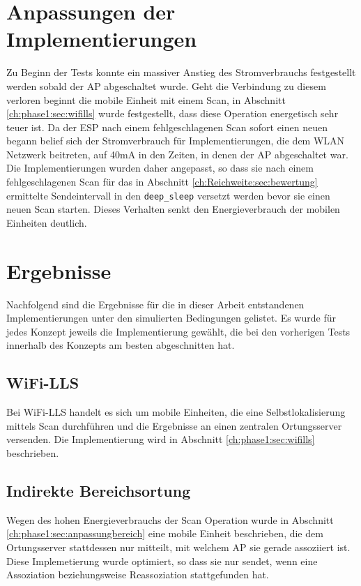 \section{Anpassungen der Implementierungen}
Zu Beginn der Tests konnte ein massiver Anstieg des Stromverbrauchs festgestellt werden sobald der AP abgeschaltet wurde.
Geht die Verbindung zu diesem verloren beginnt die mobile Einheit mit einem Scan, in Abschnitt \ref{ch:phase1:sec:wifills} wurde festgestellt, dass diese Operation energetisch sehr teuer ist.
Da der ESP nach einem fehlgeschlagenen Scan sofort einen neuen begann belief sich der Stromverbrauch für Implementierungen, die dem WLAN Netzwerk beitreten, auf 40mA in den Zeiten, in denen der AP abgeschaltet war.
Die Implementierungen wurden daher angepasst, so dass sie nach einem fehlgeschlagenen Scan für das in Abschnitt \ref{ch:Reichweite:sec:bewertung} ermittelte Sendeintervall in den \texttt{deep\_sleep} versetzt werden bevor sie einen neuen Scan starten.
Dieses Verhalten senkt den Energieverbrauch der mobilen Einheiten deutlich.

\section{Ergebnisse}
Nachfolgend sind die Ergebnisse für die in dieser Arbeit entstandenen Implementierungen unter den simulierten Bedingungen gelistet.
Es wurde für jedes Konzept jeweils die Implementierung gewählt, die bei den vorherigen Tests innerhalb des Konzepts am besten abgeschnitten hat.\\


\subsection{WiFi-LLS}
Bei WiFi-LLS handelt es sich um mobile Einheiten, die eine Selbstlokalisierung mittels Scan durchführen und die Ergebnisse an einen zentralen Ortungsserver versenden.
Die Implementierung wird in Abschnitt \ref{ch:phase1:sec:wifills} beschrieben.

\subsection{Indirekte Bereichsortung}
Wegen des hohen Energieverbrauchs der Scan Operation wurde in Abschnitt \ref{ch:phase1:sec:anpassungbereich} eine mobile Einheit beschrieben, die dem Ortungsserver stattdessen nur mitteilt, mit welchem AP sie gerade assoziiert ist. 
Diese Implemetierung wurde optimiert, so dass sie nur sendet, wenn eine Assoziation beziehungsweise Reassoziation stattgefunden hat.


